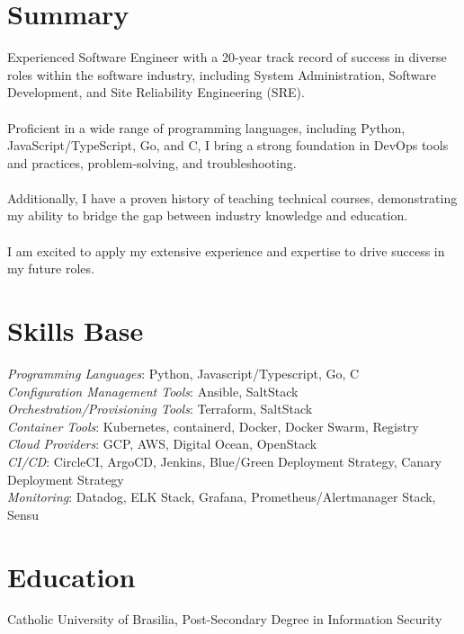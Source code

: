 \documentclass[margin]{res}
\begin{document}

\address{Winnipeg, MB, Canada \\
  \href{mailto:brunocriado@gmail.com}{brunocriado@gmail.com} \\ Phone: +1 431 588 3334}


\begin{resume}

  \section{Summary} Experienced Software Engineer with a 20-year track record of success in diverse roles within the software industry, including System Administration, Software Development, and Site Reliability Engineering (SRE). \\ \\
  Proficient in a wide range of programming languages, including Python, JavaScript/TypeScript, Go, and C, I bring a strong foundation in DevOps tools and practices, problem-solving, and troubleshooting. \\ \\
  Additionally, I have a proven history of teaching technical courses, demonstrating my ability to bridge the gap between industry knowledge and education. \\ \\
  I am excited to apply my extensive experience and expertise to drive success in my future roles.

  \section{Skills Base}
  \textit{Programming Languages}: Python, Javascript/Typescript, Go, C\\
  \textit{Configuration Management Tools}: Ansible, SaltStack\\
  \textit{Orchestration/Provisioning Tools}: Terraform, SaltStack\\
  \textit{Container Tools}: Kubernetes, containerd, Docker, Docker Swarm, Registry\\
  \textit{Cloud Providers}: GCP, AWS, Digital Ocean, OpenStack\\
  \textit{CI/CD}: CircleCI, ArgoCD, Jenkins, Blue/Green Deployment Strategy, Canary Deployment Strategy\\
  \textit{Monitoring}: Datadog, ELK Stack, Grafana, Prometheus/Alertmanager Stack, Sensu

  \section{Education} Catholic University of Brasilia, Post-Secondary Degree in Information
  Security


\end{resume}
\end{document}
